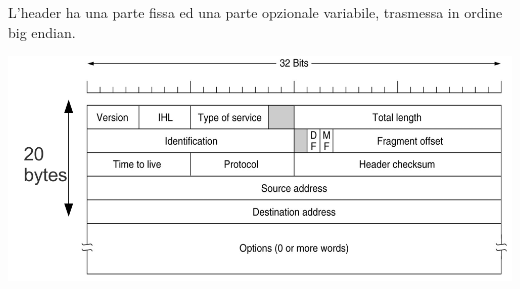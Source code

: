             L'header ha una parte fissa ed una parte opzionale variabile, trasmessa in ordine big endian.

            \begin{center}
                \includegraphics[scale=0.34]{chapters/4/assets/schema_d.png}
            \end{center}

